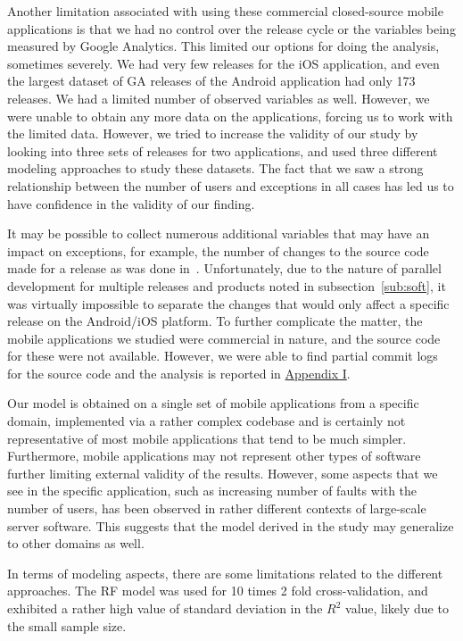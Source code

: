 \documentclass[smallcondensed]{svjour3}     %
\begin{document}
Another limitation associated with using these commercial closed-source 
mobile applications is that we had no control over the release cycle or the
variables being measured by Google Analytics. This limited our options for 
doing the analysis, sometimes 
severely. We had very few releases for the iOS application, and even the largest
dataset of GA releases of the Android application had only 173 releases. We had 
a limited number of observed variables as well. However, we were unable to obtain
any more data on the applications, forcing us to work with the limited data. 
However, we tried to increase the validity of our study by looking into three 
sets of releases for two applications, and used three different modeling approaches 
to study these datasets. The fact that we saw a strong relationship between the number
of users and exceptions in all cases has led us to have confidence in the validity
of our finding. 

It may be possible to collect numerous additional variables that may
have an impact on exceptions, for example, the number of changes to
the source code made for a release as was done
in~\cite{IQ08}. Unfortunately, due to the nature of parallel
development for multiple releases and products noted in
subsection~\ref{sub:soft}, it was virtually impossible to separate
the changes that would only affect a specific release on the Android/iOS
platform. To further complicate the matter, the mobile applications we studied
were commercial in nature, and the source code for these were not available.
However, we were able to find partial commit logs for the source code and the 
analysis is reported in \hyperref[app1]{Appendix I}.  

Our model is obtained on a single set of mobile applications 
from a specific domain, implemented via
a rather complex codebase and is certainly not representative of
most mobile applications that tend to be much simpler. Furthermore,
mobile applications  
may not represent other types of software further limiting external
validity of the results. However, some aspects that we see in the
specific application, such as increasing number of faults with the
number of users, has been observed in rather different contexts of
large-scale server software. This suggests that the model derived in
the study may generalize to other domains as well. 


In terms of modeling aspects, there are some limitations related to the different approaches.
 The RF model was used for 10 times 2 fold cross-validation, and exhibited a rather high value of standard deviation in the $R^2$ value,  likely due to the small sample size.
\end{document}

